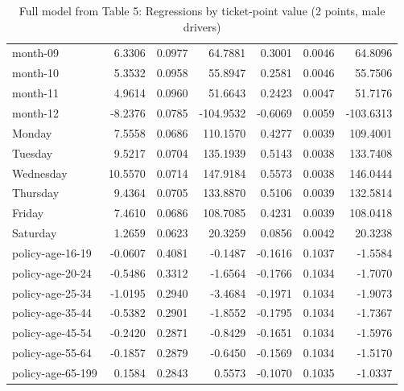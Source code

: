\documentclass[10pt]{article}
\begin{document}
\begin{table}[ht]
\begin{tabular}{lrrrrrr}
  month-09 & 6.3306 & 0.0977 & 64.7881 & 0.3001 & 0.0046 & 64.8096 \\ 
  month-10 & 5.3532 & 0.0958 & 55.8947 & 0.2581 & 0.0046 & 55.7506 \\ 
  month-11 & 4.9614 & 0.0960 & 51.6643 & 0.2423 & 0.0047 & 51.7176 \\ 
  month-12 & -8.2376 & 0.0785 & -104.9532 & -0.6069 & 0.0059 & -103.6313 \\ 
  Monday & 7.5558 & 0.0686 & 110.1570 & 0.4277 & 0.0039 & 109.4001 \\ 
  Tuesday & 9.5217 & 0.0704 & 135.1939 & 0.5143 & 0.0038 & 133.7408 \\ 
  Wednesday & 10.5570 & 0.0714 & 147.9184 & 0.5573 & 0.0038 & 146.0444 \\ 
  Thursday & 9.4364 & 0.0705 & 133.8870 & 0.5106 & 0.0039 & 132.5814 \\ 
  Friday & 7.4610 & 0.0686 & 108.7085 & 0.4231 & 0.0039 & 108.0418 \\ 
  Saturday & 1.2659 & 0.0623 & 20.3259 & 0.0856 & 0.0042 & 20.3238 \\ 
  policy-age-16-19 & -0.0607 & 0.4081 & -0.1487 & -0.1616 & 0.1037 & -1.5584 \\ 
  policy-age-20-24 & -0.5486 & 0.3312 & -1.6564 & -0.1766 & 0.1034 & -1.7070 \\ 
  policy-age-25-34 & -1.0195 & 0.2940 & -3.4684 & -0.1971 & 0.1034 & -1.9073 \\ 
  policy-age-35-44 & -0.5382 & 0.2901 & -1.8552 & -0.1795 & 0.1034 & -1.7367 \\ 
  policy-age-45-54 & -0.2420 & 0.2871 & -0.8429 & -0.1651 & 0.1034 & -1.5976 \\ 
  policy-age-55-64 & -0.1857 & 0.2879 & -0.6450 & -0.1569 & 0.1034 & -1.5170 \\ 
  policy-age-65-199 & 0.1584 & 0.2843 & 0.5573 & -0.1070 & 0.1035 & -1.0337 \\ 
   \hline
\end{tabular}
\caption{Full model from Table 5: Regressions by ticket-point value (2 points, male drivers)} 
\label{tab_5_2_pts_M}
\end{table}


\clearpage
\pagebreak



\end{document}
